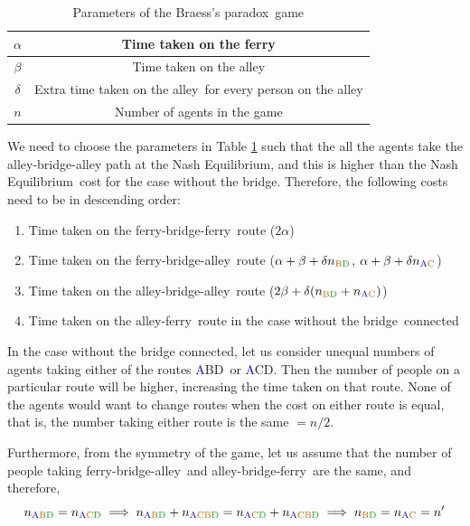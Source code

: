 \documentclass[11pt, letterpaper]{article}
\newcommand{\bp}{Braess's paradox}
\newcommand{\NE}{Nash Equilibrium}
\newcommand{\nodeA}{\textcolor{blue}{A}}
\newcommand{\nodeB}{\textcolor{orange!80!black}{B}}
\newcommand{\nodeC}{\textcolor{orange!80!black}{C}}
\newcommand{\nodeD}{\textcolor{green!70!black}{D}}
\newcommand{\pathferry}{\textcolor{cyan!40!blue}{\textsf{ferry}}}
\newcommand{\pathalley}{\textcolor{red!40!brown}{\textsf{alley}}}
\newcommand{\pathbridge}{\textsf{bridge}}
\begin{document}
\begin{table}[htbp]
    \centering
    \begin{tabular}{|c|c|}
    \hline
       $\alpha$  & Time taken on the \pathferry \\ \hline
       $\beta$  & Time taken on the \pathalley \\ \hline
       $\delta$  & Extra time taken on the \pathalley~for every person on the \pathalley\\ \hline
       $n$  & Number of agents in the game \\ \hline
    \end{tabular}
    \caption{Parameters of the \bp~game}
    \label{tab:bpParams}
\end{table}

We need to choose the parameters in Table \ref{tab:bpParams} such that the all the agents take the alley-bridge-alley path at the \NE, and this is higher than the \NE~cost for the case without the bridge. Therefore, the following costs need to be in descending order:

\begin{enumerate}
    \item Time taken on the \pathferry-\pathbridge-\pathferry~route ($2\alpha$)
    \item Time taken on the \pathferry-\pathbridge-\pathalley~route ($\alpha+\beta+\delta n_{\text{\nodeB\nodeD}}$, $\alpha+\beta+\delta n_{\text{\nodeA\nodeC}}$)
    \item Time taken on the \pathalley-\pathbridge-\pathalley~route ($2\beta+\delta(n_{\text{\nodeB\nodeD}}+n_{\text{\nodeA\nodeC}})$)
    \item Time taken on the \pathalley-\pathferry~route in the case without the \pathbridge~connected 
\end{enumerate}

In the case without the bridge connected, let us consider unequal numbers of agents taking either of the routes \nodeA\nodeB\nodeD~or \nodeA\nodeC\nodeD. Then the number of people on a particular route will be higher, increasing the time taken on that route. None of the agents would want to change routes when the cost on either route is equal, that is, the number taking either route is the same $=n/2$.

Furthermore, from the symmetry of the game, let us assume that the number of people taking \pathferry-\pathbridge-\pathalley~and \pathalley-\pathbridge-\pathferry~are the same, and therefore, $$n_{\text{\nodeA\nodeB\nodeD}}=n_{\text{\nodeA\nodeC\nodeD}} \implies n_{\text{\nodeA\nodeB\nodeD}} + n_{\text{\nodeA\nodeC\nodeB\nodeD}}=n_{\text{\nodeA\nodeC\nodeD}}+ n_{\text{\nodeA\nodeC\nodeB\nodeD}} \implies n_{\text{\nodeB\nodeD}} = n_{\text{\nodeA\nodeC}} =n'$$
\end{document}

